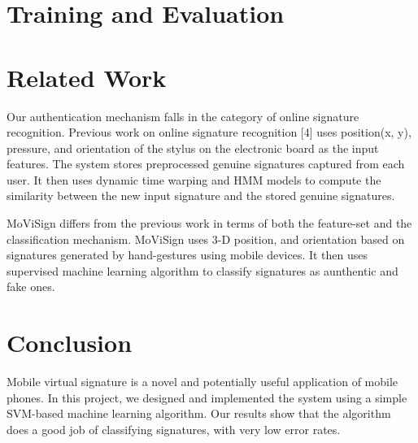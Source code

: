 \documentclass[12pt]{article}
\begin{document}
\section{Training and Evaluation}

\section{Related Work}

Our authentication mechanism falls in the category of online signature recognition. Previous work on online signature recognition [4] uses position(x, y), pressure, and orientation of the stylus on the electronic board as the input features. The system stores preprocessed genuine signatures captured from each user. It then uses dynamic time warping and HMM models to compute the similarity between the new input signature and the stored genuine signatures.

MoViSign differs from the previous work in terms of both the feature-set and the classification mechanism. MoViSign uses 3-D position, and orientation based on signatures generated by hand-gestures using mobile devices. It then uses supervised machine learning algorithm to classify signatures as aunthentic and fake ones.
 
\section{Conclusion}

Mobile virtual signature is a novel and potentially useful application of mobile phones. In this project, we designed and implemented the system using a simple SVM-based machine learning algorithm. Our results show that the algorithm does a good job of classifying signatures, with very low error rates.
\end{document}
